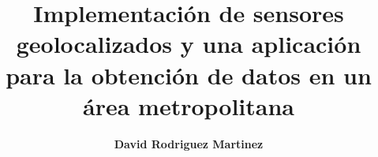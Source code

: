 \documentclass[11pt,spanish,listoffigures,listoftables]{tfgetsinf}
\title{Implementación de sensores geolocalizados y una aplicación para la obtención de datos en un área metropolitana}
\author{\textbf{David Rodriguez Martinez}}
\begin{document}


\clearpage
\lstlistoflistings

\mainmatter





















\cleardoublepage

\end{document}
